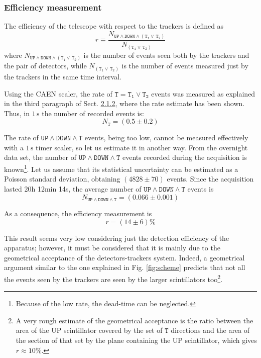 \documentclass[a4paper]{article}
\begin{document}
\subsubsection{Efficiency measurement} 
\hypertarget{efficiency}{}
The efficiency of the telescope with respect to the trackers is defined as 
$$r\equiv\dfrac{N_{\mathtt{UP \wedge DOWN \wedge (T_1 \vee\, T_2)}}}{N_\mathtt{(T_1 \vee \,T_2)}}$$
where $N_{\mathtt{UP \wedge DOWN \wedge (T_1 \vee\, T_2)}}$ is the number of events seen both by the trackers and the pair of detectors, while $N_\mathtt{(T_1 \vee \,T_2)}$ is the number of events measured just by the trackers in the same time interval. 
 
Using the CAEN scaler, the rate of $\mathtt{T=T_1\vee T_2}$ events was measured as explained in the third paragraph of Sect. \hyperlink{2.1.2}{2.1.2}, where the rate estimate has been shown. Thus, in $1\,\mathrm{s}$ the number of recorded events is:
 $$N_\mathtt{T}=(0.5\pm0.2)$$
 
The rate of $\mathtt{UP\wedge DOWN\wedge T }$ events, being too low, cannot be measured effectively with a $1\,\mathrm{s}$ timer scaler, so let us estimate it in another way. From the overnight data set, the number of $\mathtt{UP\wedge DOWN\wedge T }$ events recorded during the acquisition is known\footnote{Because of the low rate, the dead-time can be neglected.}. Let us assume that its statistical uncertainty can be estimated as a Poisson standard deviation, obtaining $(4828\pm70)$ events. Since the acquisition lasted 20h 12min 14s, the average number of $\mathtt{UP\wedge DOWN\wedge T }$ events is %
$$N_\mathtt{UP\wedge DOWN\wedge T} =(0.066 \pm0.001)$$
 
As a consequence, the efficiency measurement is 
$$r=(14\pm6)\%$$

This result seems very low considering just the detection efficiency of the apparatus; however, it must be considered that it is mainly due to the geometrical acceptance of the detectors-trackers system. 
Indeed, a geometrical argument similar to the one explained in Fig. \ref{fig:scheme} predicts that not all the events seen by the trackers are seen by the larger scintillators too\footnote{A very rough estimate of the geometrical acceptance is the ratio between the area of the UP scintillator covered by the set of $\mathtt{T}$ directions and the area of the section of that set by the plane containing the UP scintillator, which gives $r\approx 10\%$.}. 
\end{document}
